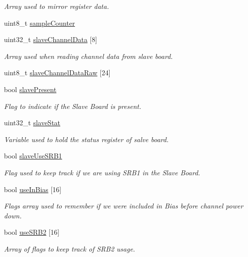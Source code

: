 \begin{DoxyCompactItemize}
\begin{DoxyCompactList}\small\item\em Array used to mirror register data. \end{DoxyCompactList}\item 
uint8\+\_\+t \hyperlink{group__ADS1299__Library_ga5413f90a1ad32d11a00aa20df8d9ba3c}{sample\+Counter}
\item 
uint32\+\_\+t \hyperlink{group__ADS1299__Library_ga35a75511ee01afa88d18d47b2a6b401b}{slave\+Channel\+Data} \mbox{[}8\mbox{]}
\begin{DoxyCompactList}\small\item\em Array used when reading channel data from slave board. \end{DoxyCompactList}\item 
uint8\+\_\+t \hyperlink{group__ADS1299__Library_gafe36c371f2977643715e7d7c88465098}{slave\+Channel\+Data\+Raw} \mbox{[}24\mbox{]}
\item 
bool \hyperlink{group__ADS1299__Library_ga4a8b8caa32595ce77863dd529953d13b}{slave\+Present}
\begin{DoxyCompactList}\small\item\em Flag to indicate if the Slave Board is present. \end{DoxyCompactList}\item 
uint32\+\_\+t \hyperlink{group__ADS1299__Library_ga107f0202d1ef78dcc5b63e143044ffdf}{slave\+Stat}
\begin{DoxyCompactList}\small\item\em Variable used to hold the status register of salve board. \end{DoxyCompactList}\item 
bool \hyperlink{group__ADS1299__Library_gab67cf8829f1fda0edfe4fcb89a00f8d1}{slave\+Use\+S\+R\+B1}
\begin{DoxyCompactList}\small\item\em Flag used to keep track if we are using S\+R\+B1 in the Slave Board. \end{DoxyCompactList}\item 
bool \hyperlink{group__ADS1299__Library_gaab7b7dca51dd80f61785f355b03b0555}{use\+In\+Bias} \mbox{[}16\mbox{]}
\begin{DoxyCompactList}\small\item\em Flags array used to remember if we were included in Bias before channel power down. \end{DoxyCompactList}\item 
bool \hyperlink{group__ADS1299__Library_ga96bc68ed80305391fa5bbcc88557d776}{use\+S\+R\+B2} \mbox{[}16\mbox{]}
\begin{DoxyCompactList}\small\item\em Array of flags to keep track of S\+R\+B2 usage. \end{DoxyCompactList}\end{DoxyCompactItemize}


